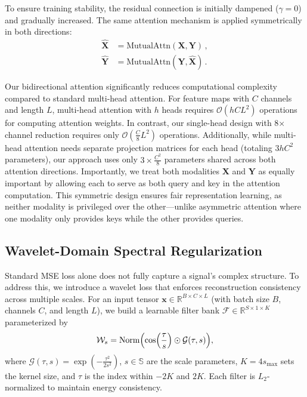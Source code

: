 \documentclass[conference]{IEEEtran}
\begin{document}
To ensure training stability, the residual connection is initially dampened ($\gamma=0$) and gradually increased. The same attention mechanism is applied symmetrically in both directions:
\begin{equation}
    \begin{aligned}
        \widehat{\mathbf{X}} & = \text{MutualAttn}(\mathbf{X}, \mathbf{Y})\,,           \\
        \widehat{\mathbf{Y}} & = \text{MutualAttn}(\mathbf{Y}, \widehat{\mathbf{X}})\,.
    \end{aligned}
\end{equation}

Our bidirectional attention significantly reduces computational complexity compared to standard multi-head attention. For feature maps with $C$ channels and length $L$, multi-head attention with $h$ heads requires $\mathcal{O}(hCL^2)$ operations for computing attention weights. In contrast, our single-head design with 8× channel reduction requires only $\mathcal{O}(\frac{C}{8}L^2)$ operations. Additionally, while multi-head attention needs separate projection matrices for each head (totaling $3hC^2$ parameters), our approach uses only $3 \times \frac{C^2}{8}$ parameters shared across both attention directions. Importantly, we treat both modalities $\mathbf{X}$ and $\mathbf{Y}$ as equally important by allowing each to serve as both query and key in the attention computation. This symmetric design ensures fair representation learning, as neither modality is privileged over the other—unlike asymmetric attention where one modality only provides keys while the other provides queries. 



\subsection{Wavelet-Domain Spectral Regularization}
\label{subsec:wavelet}

Standard MSE loss alone does not fully capture a signal's complex structure. To address this, we introduce a wavelet loss that enforces reconstruction consistency across multiple scales. For an input tensor $\mathbf{x}\in\mathbb{R}^{B\times C\times L}$ (with batch size $B$, channels $C$, and length $L$), we build a learnable filter bank $\mathcal{F}\in\mathbb{R}^{S\times 1\times K}$ parameterized by
\begin{equation}
    \label{eq:wavelet}
    \mathcal{W}_s = \operatorname{Norm}\Bigl(\cos\Bigl(\frac{\tau}{s}\Bigr) \odot \mathcal{G}(\tau,s)\Bigr),
\end{equation}
where $\mathcal{G}(\tau,s)=\exp\left(-\frac{\tau^2}{2s^2}\right)$, $s\in\mathbb{S}$ are the scale parameters, $K=4s_{\text{max}}$ sets the kernel size, and $\tau$ is the index within $-2K$ and $2K$. Each filter is $L_2$-normalized to maintain energy consistency.
\end{document}
